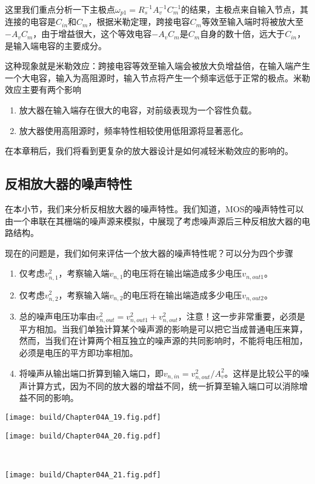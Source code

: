这里我们重点分析一下主极点$\omega_{p1}=R_s^{-1}A_v^{-1}C_{m}^{-1}$的结果，主极点来自输入节点，其连接的电容是$C_{in}$和$C_m$，根据米勒定理，跨接电容$C_m$等效至输入端时将被放大至$-A_vC_m$，由于增益很大，这个等效电容$-A_vC_m$是$C_m$自身的数十倍，远大于$C_{in}$，是输入端电容的主要成分。

这种现象就是米勒效应：跨接电容等效至输入端会被放大负增益倍，在输入端产生一个大电容，输入为高阻源时，输入节点将产生一个频率远低于正常的极点。米勒效应主要有两个影响
\begin{enumerate}
    \item 放大器在输入端存在很大的电容，对前级表现为一个容性负载。
    \item 放大器使用高阻源时，频率特性相较使用低阻源将显著恶化。
\end{enumerate}
在本章稍后，我们将看到更复杂的放大器设计是如何减轻米勒效应的影响的。

\subsection{反相放大器的噪声特性}
在本小节，我们来分析反相放大器的噪声特性。我们知道，MOS的噪声特性可以由一个串联在其栅端的噪声源来模拟，中展现了考虑噪声源后三种反相放大器的电路结构。

现在的问题是，我们如何来评估一个放大器的噪声特性呢？可以分为四个步骤
\begin{enumerate}
    \item 仅考虑$v_{n,1}^2$，考察输入端$v_{n,1}$的电压将在输出端造成多少电压$v_{n,out1}$。
    \item 仅考虑$v_{n,2}^2$，考察输入端$v_{n,2}$的电压将在输出端造成多少电压$v_{n,out2}$。
    \item 总的噪声电压功率由$v_{n,out}^2=v_{n,out1}^2+v_{n,out}^2$，注意！这一步非常重要，必须是平方相加。当我们单独计算某个噪声源的影响是可以把它当成普通电压来算，然而，当我们在计算两个相互独立的噪声源的共同影响时，不能将电压相加，必须是电压的平方即功率相加。
    \item 将噪声从输出端口折算到输入端口，即$v_{n,in}=v_{n,out}^2/A_v^2$。这样是比较公平的噪声计算方式，因为不同的放大器的增益不同，统一折算至输入端口可以消除增益不同的影响。
\end{enumerate}

\begin{Figure}[反相放大器的噪声]
    \begin{FigureSub}
        \texttt{[image: build/Chapter04A\_19.fig.pdf]}
    \end{FigureSub}\qquad
    \begin{FigureSub}
        \texttt{[image: build/Chapter04A\_20.fig.pdf]}
    \end{FigureSub}\\ \vspace{0.1cm}
    \begin{FigureSub}
        \texttt{[image: build/Chapter04A\_21.fig.pdf]}
    \end{FigureSub}
\end{Figure}



